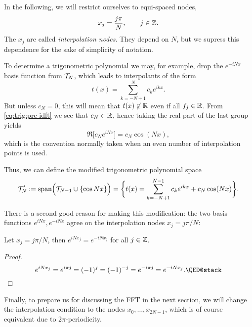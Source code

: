 In the following, we will restrict ourselves to equi-spaced nodes, 
\[
  x_j =  \frac{j \pi}{N},  \qquad j \in \mathbb{Z}.
\]
The $x_j$ are called {\em interpolation nodes}. They depend on $N$, but we
supress this dependence for the sake of simplicity of notation.

To determine a trigonometric polynomial we may, for example, 
drop the $e^{-iNx}$ basis function from $\mathcal{T}_N$, which leads to 
interpolants of the form 
\[
    t(x) = \sum_{k = -N+1}^N c_k e^{ik x}.
\]
But unless $c_N = 0$, this will mean that $t(x) \not\in \mathbb{R}$ even if all $f_j \in
\mathbb{R}$. From \eqref{eq:trig:pre-idft} we see that $c_N \in \mathbb{R}$, hence taking 
the real part of the last group yields 
\[
    \Re \big[ c_N e^{i N x} \big]   = c_N \cos(Nx),
\]
which is the convention normally taken when an even number of interpolation 
points is used. 

Thus, we can define the modified trigonometric polynomial space 
\[
  \mathcal{T}_N' := {\rm span}\Big(\mathcal{T}_{N-1} \cup \{ \cos N x \} \Big)
    =  \bigg\{ t(x) = \sum_{k = -N+1}^{N-1} c_k e^{ikx} + c_N \cos(Nx) \bigg\}.  
\]

There is a second good reason for making this modification: the two 
basis functions $e^{iNx}, e^{-iNx}$ agree on the interpolation nodes 
$x_j = j \pi / N$: 

\begin{lemma} \label{th:trig:baby-aliasing}
  Let $x_j = j \pi / N$, then $e^{iN x_j} = e^{-iNx_j}$ for all 
  $j \in \mathbb{Z}$.
\end{lemma}
\begin{proof}
  \[
    e^{iNx_j} = e^{i \pi j} = (-1)^j = (-1)^{-j} = e^{-i\pi j} = e^{-iNx_j}.
    \qedhere
  \]
\end{proof}


Finally, to prepare us for discussing the FFT in the next section, we will
change the interpolation condition to the nodes $x_0, \dots, x_{2N-1}$, which is
of course equivalent due to $2\pi$-periodicity.

